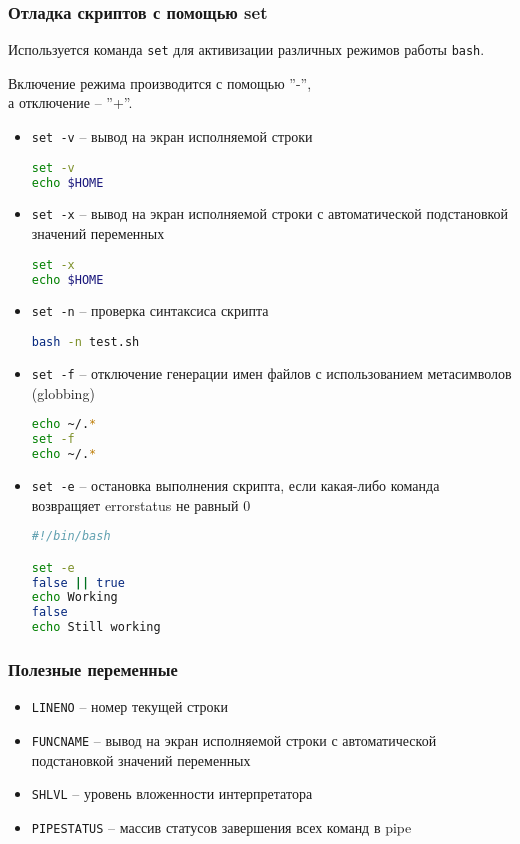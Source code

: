\begin{frame}
	\frametitle{Отладка скриптов с помощью set}
	
	Используется команда {\tt set} для активизации различных режимов работы {\tt bash}.

	Включение режима производится с помощью ''-'',\\
	а отключение -- ''+''.

	\begin{itemize}
		\item {\tt set -v} -- вывод на экран исполняемой строки
			\begin{lstlisting}[language=sh]
set -v
echo $HOME
			\end{lstlisting}

		\item {\tt set -x} -- вывод на экран исполняемой строки с автоматической подстановкой значений переменных
\begin{lstlisting}[language=sh]
set -x
echo $HOME
\end{lstlisting}

		\item {\tt set -n} -- проверка синтаксиса скрипта
\begin{lstlisting}[language=sh]
bash -n test.sh
\end{lstlisting} 


		\item {\tt set -f} -- отключение генерации имен файлов с использованием метасимволов (globbing)
\begin{lstlisting}[language=sh]
echo ~/.*
set -f
echo ~/.*
\end{lstlisting} 
		\framebreak
		\item {\tt set -e} -- остановка выполнения скрипта, если какая-либо команда 
		возвращяет errorstatus не равный 0
			\begin{lstlisting}[language=sh]
#!/bin/bash

set -e
false || true
echo Working
false
echo Still working
			\end{lstlisting} 
	\end{itemize}
\end{frame}

\begin{frame}[fragile]
	\frametitle{Полезные переменные}

	\begin{itemize}
		\item {\tt LINENO} -- номер текущей строки
		\item {\tt FUNCNAME} -- вывод на экран исполняемой строки с автоматической подстановкой значений переменных
		\item {\tt SHLVL} -- уровень вложенности интерпретатора
		\item {\tt PIPESTATUS} -- массив статусов завершения всех команд в pipe
	\end{itemize}
\end{frame}

